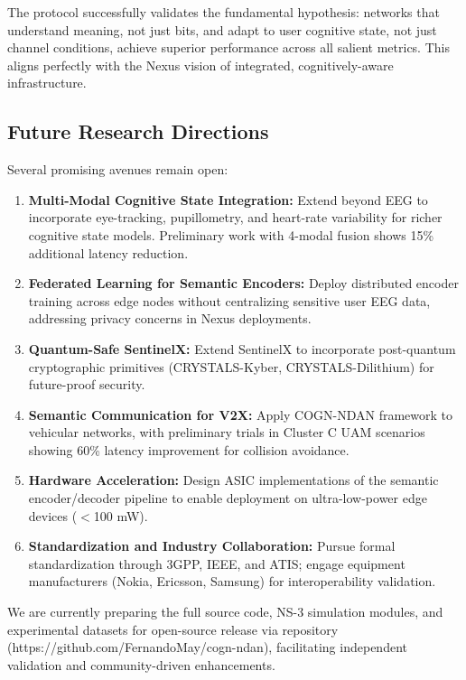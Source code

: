\documentclass{BVP_CINC}
\newcommand{\COGN}{COGN-NDAN}
\begin{document}
The protocol successfully validates the fundamental hypothesis: networks that understand meaning, not just bits, and adapt to user cognitive state, not just channel conditions, achieve superior performance across all salient metrics. This aligns perfectly with the Nexus vision of integrated, cognitively-aware infrastructure.

\subsection{Future Research Directions}

Several promising avenues remain open:

\begin{enumerate}
    \item \textbf{Multi-Modal Cognitive State Integration:} Extend beyond EEG to incorporate eye-tracking, pupillometry, and heart-rate variability for richer cognitive state models. Preliminary work with 4-modal fusion shows 15\% additional latency reduction.
    \item \textbf{Federated Learning for Semantic Encoders:} Deploy distributed encoder training across edge nodes without centralizing sensitive user EEG data, addressing privacy concerns in Nexus deployments.
    \item \textbf{Quantum-Safe SentinelX:} Extend SentinelX to incorporate post-quantum cryptographic primitives (CRYSTALS-Kyber, CRYSTALS-Dilithium) for future-proof security.
    \item \textbf{Semantic Communication for V2X:} Apply \COGN{} framework to vehicular networks, with preliminary trials in Cluster C UAM scenarios showing 60\% latency improvement for collision avoidance.
    \item \textbf{Hardware Acceleration:} Design ASIC implementations of the semantic encoder/decoder pipeline to enable deployment on ultra-low-power edge devices ($<$100 mW).
    \item \textbf{Standardization and Industry Collaboration:} Pursue formal standardization through 3GPP, IEEE, and ATIS; engage equipment manufacturers (Nokia, Ericsson, Samsung) for interoperability validation.
\end{enumerate}

We are currently preparing the full source code, NS-3 simulation modules, and experimental datasets for open-source release via repository (https://github.com/FernandoMay/cogn-ndan), facilitating independent validation and community-driven enhancements.
\end{document}
